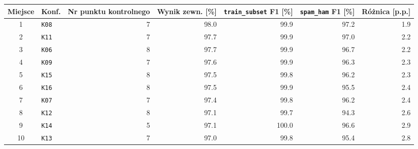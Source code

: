 \begin{tabular}{clrrrrr}
\hline
\textbf{Miejsce} & \textbf{Konf.} & \textbf{Nr punktu kontrolnego} & \textbf{Wynik zewn. [\%]} & \textbf{\texttt{train\_subset} F1 [\%]} & \textbf{\texttt{spam\_ham} F1 [\%]} & \textbf{Różnica [p.p.]} \\
\hline
1 & \texttt{K08} & 7 & 98.0 & 99.9 & 97.2 & 1.9 \\
2 & \texttt{K11} & 7 & 97.7 & 99.9 & 97.0 & 2.2 \\
3 & \texttt{K06} & 8 & 97.7 & 99.9 & 96.7 & 2.2 \\
4 & \texttt{K09} & 7 & 97.6 & 99.9 & 96.3 & 2.3 \\
5 & \texttt{K15} & 8 & 97.5 & 99.8 & 96.2 & 2.3 \\
6 & \texttt{K16} & 8 & 97.5 & 99.9 & 95.5 & 2.4 \\
7 & \texttt{K07} & 7 & 97.4 & 99.8 & 96.2 & 2.4 \\
8 & \texttt{K12} & 8 & 97.1 & 99.7 & 94.3 & 2.6 \\
9 & \texttt{K14} & 5 & 97.1 & 100.0 & 96.6 & 2.9 \\
10 & \texttt{K13} & 7 & 97.0 & 99.8 & 95.4 & 2.8 \\
\hline
\end{tabular}
